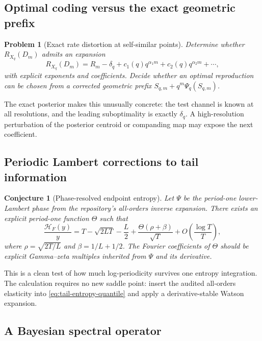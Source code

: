 \documentclass[11pt,oneside]{article}
\newtheorem{conjecture}[theorem]{Conjecture}
\newtheorem{problem}[theorem]{Problem}
\theoremstyle{definition}
\theoremstyle{remark}
\begin{document}
\subsection{Optimal coding versus the exact geometric prefix}

\begin{problem}[Exact rate distortion at self-similar points]
\label{prob:exact-RD}
Determine whether $R_{X_q}(D_m)$ admits an expansion
\begin{equation}
 R_{X_q}(D_m)
 =R_m-\delta_q+c_1(q)q^{\alpha_1m}+c_2(q)q^{\alpha_2m}+\cdots,
 \label{eq:RD-expansion}
\end{equation}
with explicit exponents and coefficients.  Decide whether an optimal reproduction
can be chosen from a corrected geometric prefix
$S_{q,m}+q^m\Psi_q(S_{q,m})$.
\end{problem}

The exact posterior makes this unusually concrete: the test channel is known at
all resolutions, and the leading suboptimality is exactly $\delta_q$.  A
high-resolution perturbation of the posterior centroid or companding map may
expose the next coefficient.

\subsection{Periodic Lambert corrections to tail information}

\begin{conjecture}[Phase-resolved endpoint entropy]
\label{conj:tail-phase}
Let $\Psi$ be the period-one lower-Lambert phase from the repository's all-orders
inverse expansion.  There exists an explicit period-one function $\Theta$ such
that
\begin{equation}
 \frac{\mathscr H_F(y)}{y}
 =T-\sqrt{2LT}-\frac L2
 +\frac{\Theta(\rho+\beta)}{\sqrt T}
 +O\!\left(\frac{\log T}{T}\right),
 \label{eq:tail-phase}
\end{equation}
where $\rho=\sqrt{2T/L}$ and $\beta=1/L+1/2$.  The Fourier coefficients of
$\Theta$ should be explicit Gamma--zeta multiples inherited from $\Psi$ and its
derivative.
\end{conjecture}

This is a clean test of how much log-periodicity survives one entropy integration.
The calculation requires no new saddle point: insert the audited all-orders
elasticity into \eqref{eq:tail-entropy-quantile} and apply a derivative-stable
Watson expansion.

\subsection{A Bayesian spectral operator}
\end{document}
